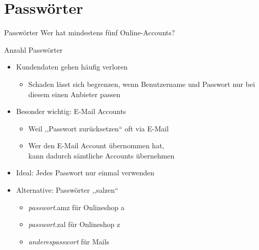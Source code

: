 \section{Passwörter}
  \begin{frame}{Passwörter}
    Wer hat mindestens fünf Online-Accounts?

  \end{frame}

  \begin{frame}{Anzahl Passwörter}
    \begin{itemize}
      \item Kundendaten gehen häufig verloren
      \begin{itemize}
        \item Schaden lässt sich begrenzen, wenn Benutzername und Passwort nur bei diesem einen Anbieter passen
      \end{itemize}
      \item Besonder wichtig: E-Mail Accounts
      \begin{itemize}
        \item Weil ,,Passwort zurücksetzen`` oft via E-Mail
        \item Wer den E-Mail Account übernommen hat,\\ kann dadurch sämtliche Accounts übernehmen
      \end{itemize}
      \item Ideal: Jedes Passwort nur einmal verwenden
      \item Alternative: Passwörter ,,salzen``
      \begin{itemize}
        \item \textit{passwort}.amz für Onlineshop a
        \item \textit{passwort}.zal für Onlineshop z
        \item \textit{anderespasswort} für Mails
      \end{itemize}
    \end{itemize}
  \end{frame}

